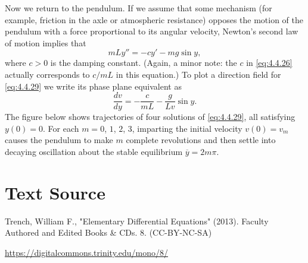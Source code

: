 \documentclass{ximera}
\begin{document}
 
\begin{example}\label{example:4.4.5}
Now we
return to the pendulum. If we assume that
some mechanism (for example, friction in the axle or atmospheric
resistance) opposes the motion of the pendulum with a force
proportional to its angular velocity,  Newton's second law of
motion implies that
\begin{equation} \label{eq:4.4.29}
mLy''=-cy'-mg\sin y,
\end{equation}
where $c>0$ is the damping constant. (Again, a minor note: the $c$
in \eqref{eq:4.4.26} actually corresponds to $c/mL$ in this equation.)
To plot a direction field for \eqref{eq:4.4.29} we write its phase plane
equivalent as
$$
\frac{dv}{dy}=-\frac{c}{mL}-\frac{g}{Lv}\sin y.
$$
The figure below shows
trajectories of four solutions of \eqref{eq:4.4.29}, all satisfying
$y(0)=0$. For each $m=0$, $1$, $2$, $3$, imparting the initial velocity
$v(0)=v_m$ causes the pendulum to make $m$ complete revolutions and
then settle into decaying oscillation about the stable equilibrium
$\overline{y}=2m\pi$.
 
 
 
\end{example}
 
 
 
 
 
 
\section*{Text Source}
Trench, William F., "Elementary Differential Equations" (2013). Faculty Authored and Edited Books \& CDs. 8. (CC-BY-NC-SA)
 
\href{https://digitalcommons.trinity.edu/mono/8/}{https://digitalcommons.trinity.edu/mono/8/}
 
 
\end{document}
